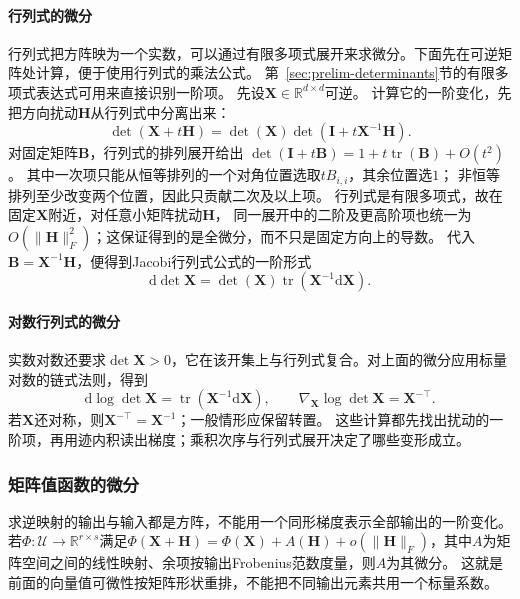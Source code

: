 \paragraph{行列式的微分}
行列式把方阵映为一个实数，可以通过有限多项式展开来求微分。下面先在可逆矩阵处计算，便于使用行列式的乘法公式。
第~\ref{sec:prelim-determinants}节的有限多项式表达式可用来直接识别一阶项。
先设$\bm X\in\mathbb R^{d\times d}$可逆。
计算它的一阶变化，先把方向扰动$\bm H$从行列式中分离出来：
\[
 \det(\bm X+t\bm H)=\det(\bm X)\det(\bm I+t\bm X^{-1}\bm H).
\]
对固定矩阵$\bm B$，行列式的排列展开给出
$\det(\bm I+t\bm B)=1+t\operatorname{tr}(\bm B)+O(t^2)$。
其中一次项只能从恒等排列的一个对角位置选取$tB_{i,i}$，其余位置选$1$；
非恒等排列至少改变两个位置，因此只贡献二次及以上项。
行列式是有限多项式，故在固定$\bm X$附近，对任意小矩阵扰动$\bm H$，
同一展开中的二阶及更高阶项也统一为$O(\lVert\bm H\rVert_F^2)$；这保证得到的是全微分，而不只是固定方向上的导数。
代入$\bm B=\bm X^{-1}\bm H$，便得到Jacobi行列式公式的一阶形式
\[   \mathrm{d}\det\bm{X}   =   \det(\bm{X})\operatorname{tr}   (\bm{X}^{-1}\mathrm{d}\bm{X}). \]
\paragraph{对数行列式的微分}
实数对数还要求$\det\bm X>0$，它在该开集上与行列式复合。对上面的微分应用标量对数的链式法则，得到
\begin{equation}
  \mathrm{d}\log\det\bm{X}
  =
  \operatorname{tr}(\bm{X}^{-1}\mathrm{d}\bm{X}),
  \qquad
  \nabla_{\bm{X}}\log\det\bm{X}
  =
  \bm{X}^{-\top}.
\label{eq:analysis-logdet-gradient}
\end{equation}
若$\bm X$还对称，则$\bm{X}^{-\top}=\bm{X}^{-1}$；一般情形应保留转置。
这些计算都先找出扰动的一阶项，再用迹内积读出梯度；乘积次序与行列式展开决定了哪些变形成立。

\subsubsection{矩阵值函数的微分}

求逆映射的输出与输入都是方阵，不能用一个同形梯度表示全部输出的一阶变化。
若$\Phi:\mathcal U\to\mathbb R^{r\times s}$满足$\Phi(\bm X+\bm H)=\Phi(\bm X)+A(\bm H)+o(\lVert\bm H\rVert_F)$，其中$A$为矩阵空间之间的线性映射、余项按输出Frobenius范数度量，则$A$为其微分。
这就是前面的向量值可微性按矩阵形状重排，不能把不同输出元素共用一个标量系数。

